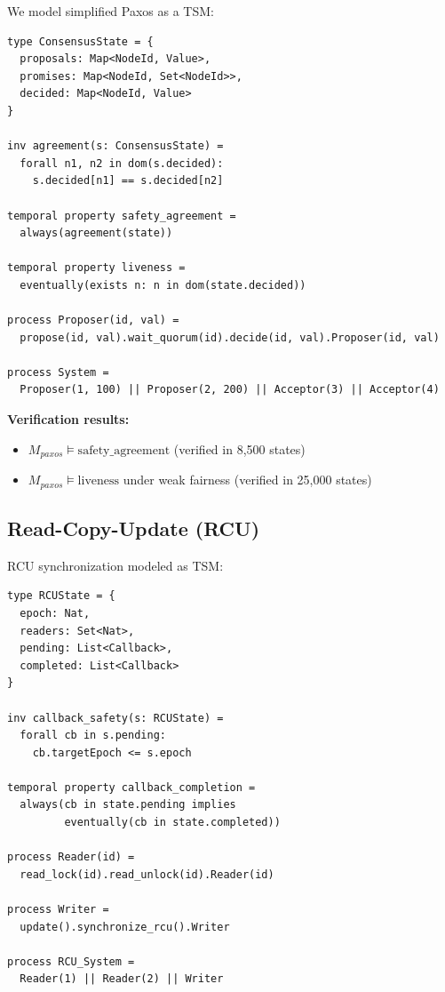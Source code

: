 \documentclass[conference]{IEEEtran}
\begin{document}
We model simplified Paxos as a TSM:

\begin{lstlisting}[caption={Paxos TSM}]
type ConsensusState = {
  proposals: Map<NodeId, Value>,
  promises: Map<NodeId, Set<NodeId>>,
  decided: Map<NodeId, Value>
}

inv agreement(s: ConsensusState) =
  forall n1, n2 in dom(s.decided):
    s.decided[n1] == s.decided[n2]

temporal property safety_agreement =
  always(agreement(state))

temporal property liveness =
  eventually(exists n: n in dom(state.decided))

process Proposer(id, val) =
  propose(id, val).wait_quorum(id).decide(id, val).Proposer(id, val)

process System =
  Proposer(1, 100) || Proposer(2, 200) || Acceptor(3) || Acceptor(4)
\end{lstlisting}

\textbf{Verification results:}
\begin{itemize}
\item $M_{paxos} \models \text{safety\_agreement}$ (verified in 8,500 states)
\item $M_{paxos} \models \text{liveness}$ under weak fairness (verified in 25,000 states)
\end{itemize}

\subsection{Read-Copy-Update (RCU)}

RCU synchronization modeled as TSM:

\begin{lstlisting}[caption={RCU TSM}]
type RCUState = {
  epoch: Nat,
  readers: Set<Nat>,
  pending: List<Callback>,
  completed: List<Callback>
}

inv callback_safety(s: RCUState) =
  forall cb in s.pending:
    cb.targetEpoch <= s.epoch

temporal property callback_completion =
  always(cb in state.pending implies
         eventually(cb in state.completed))

process Reader(id) =
  read_lock(id).read_unlock(id).Reader(id)

process Writer =
  update().synchronize_rcu().Writer

process RCU_System =
  Reader(1) || Reader(2) || Writer
\end{lstlisting}
\end{document}
